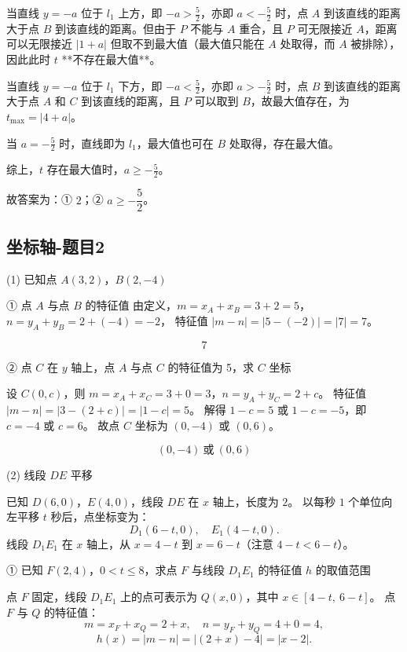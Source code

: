 当直线 \(y = -a\) 位于 \(l_1\) 上方，即 \(-a > \frac{5}{2}\)，亦即 \(a < -\frac{5}{2}\) 时，点 \(A\) 到该直线的距离大于点 \(B\) 到该直线的距离。但由于 \(P\) 不能与 \(A\) 重合，且 \(P\) 可无限接近 \(A\)，距离可以无限接近 \(|1 + a|\) 但取不到最大值（最大值只能在 \(A\) 处取得，而 \(A\) 被排除），因此此时 \(t\) **不存在最大值**。

当直线 \(y = -a\) 位于 \(l_1\) 下方，即 \(-a < \frac{5}{2}\)，亦即 \(a > -\frac{5}{2}\) 时，点 \(B\) 到该直线的距离大于点 \(A\) 和 \(C\) 到该直线的距离，且 \(P\) 可以取到 \(B\)，故最大值存在，为 \(t_{\max} = |4 + a|\)。

当 \(a = -\frac{5}{2}\) 时，直线即为 \(l_1\)，最大值也可在 \(B\) 处取得，存在最大值。

综上，\(t\) 存在最大值时，\(a \geq -\frac{5}{2}\)。

故答案为：① \(2\)；② \(a \geq -\dfrac{5}{2}\)。


\subsection{坐标轴-题目2}
\label{坐标轴-题目2}

(1) 已知点 \(A(3,2)\)，\(B(2,-4)\)

① 点 \(A\) 与点 \(B\) 的特征值
由定义，\(m = x_A + x_B = 3 + 2 = 5\)，\(n = y_A + y_B = 2 + (-4) = -2\)，
特征值 \(|m - n| = |5 - (-2)| = |7| = 7\)。

\[
\boxed{7}
\]

② 点 \(C\) 在 \(y\) 轴上，点 \(A\) 与点 \(C\) 的特征值为 5，求 \(C\) 坐标

设 \(C(0, c)\)，则 \(m = x_A + x_C = 3 + 0 = 3\)，\(n = y_A + y_C = 2 + c\)。
特征值 \(|m - n| = |3 - (2 + c)| = |1 - c| = 5\)。
解得 \(1 - c = 5\) 或 \(1 - c = -5\)，即 \(c = -4\) 或 \(c = 6\)。
故点 \(C\) 坐标为 \((0, -4)\) 或 \((0, 6)\)。

\[
\boxed{(0,-4)\ \text{或}\ (0,6)}
\]

(2) 线段 \(DE\) 平移

已知 \(D(6,0)\)，\(E(4,0)\)，线段 \(DE\) 在 \(x\) 轴上，长度为 \(2\)。  
以每秒 \(1\) 个单位向左平移 \(t\) 秒后，点坐标变为：
\[
D_1(6-t, 0),\quad E_1(4-t, 0).
\]
线段 \(D_1E_1\) 在 \(x\) 轴上，从 \(x = 4-t\) 到 \(x = 6-t\)（注意 \(4-t < 6-t\)）。

① 已知 \(F(2,4)\)，\(0 < t \le 8\)，求点 \(F\) 与线段 \(D_1E_1\) 的特征值 \(h\) 的取值范围

点 \(F\) 固定，线段 \(D_1E_1\) 上的点可表示为 \(Q(x, 0)\)，其中 \(x \in [4-t,\ 6-t]\)。  
点 \(F\) 与 \(Q\) 的特征值：
\[
m = x_F + x_Q = 2 + x,\quad n = y_F + y_Q = 4 + 0 = 4,
\]
\[
h(x) = |m - n| = |(2+x) - 4| = |x - 2|.
\]

